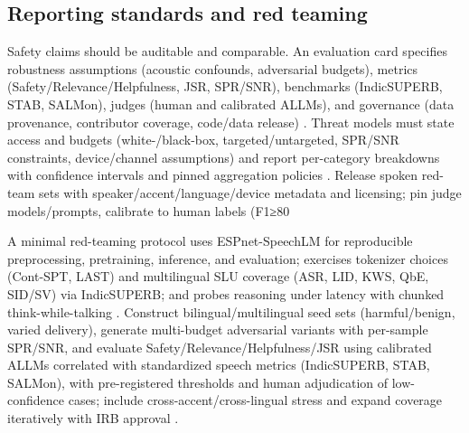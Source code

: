 \documentclass{article}
\begin{document}
\subsection{Reporting standards and red teaming} \label{subsec:Reporting standards and red teaming}
Safety claims should be auditable and comparable. An evaluation card specifies robustness assumptions (acoustic confounds, adversarial budgets), metrics (Safety/Relevance/Helpfulness, JSR, SPR/SNR), benchmarks (IndicSUPERB, STAB, SALMon), judges (human and calibrated ALLMs), and governance (data provenance, contributor coverage, code/data release) \cite{vashishth2024stabspeechtokenizerassessmentbenchmark,entry2025indicsuperbspeechprocessinguniversalperf,maimon2025salmonsuiteacousticlanguagemodelevaluati}. Threat models must state access and budgets (white-/black-box, targeted/untargeted, SPR/SNR constraints, device/channel assumptions) and report per-category breakdowns with confidence intervals and pinned aggregation policies \cite{peri2024speechguardexploringadversarialrobustnes}. Release spoken red-team sets with speaker/accent/language/device metadata and licensing; pin judge models/prompts, calibrate to human labels (F1≥80%

A minimal red-teaming protocol uses ESPnet-SpeechLM for reproducible preprocessing, pretraining, inference, and evaluation; exercises tokenizer choices (Cont-SPT, LAST) and multilingual SLU coverage (ASR, LID, KWS, QbE, SID/SV) via IndicSUPERB; and probes reasoning under latency with chunked think-while-talking \cite{tian2025espnetspeechlmopenspeechlanguagemodeltoo,li2025continuousspeechtokenizertext,turetzky2024lastlanguagemodelawarespeechtokenization,entry2025indicsuperbspeechprocessinguniversalperf,chiang2025stitchsimultaneousthinkingtalkingchunked}. Construct bilingual/multilingual seed sets (harmful/benign, varied delivery), generate multi-budget adversarial variants with per-sample SPR/SNR, and evaluate Safety/Relevance/Helpfulness/JSR using calibrated ALLMs correlated with standardized speech metrics (IndicSUPERB, STAB, SALMon), with pre-registered thresholds and human adjudication of low-confidence cases; include cross-accent/cross-lingual stress and expand coverage iteratively with IRB approval \cite{peri2024speechguardexploringadversarialrobustnes,vashishth2024stabspeechtokenizerassessmentbenchmark,maimon2025salmonsuiteacousticlanguagemodelevaluati,fu2025personalizedsociallyassistiverobotsendsp}.
\end{document}
